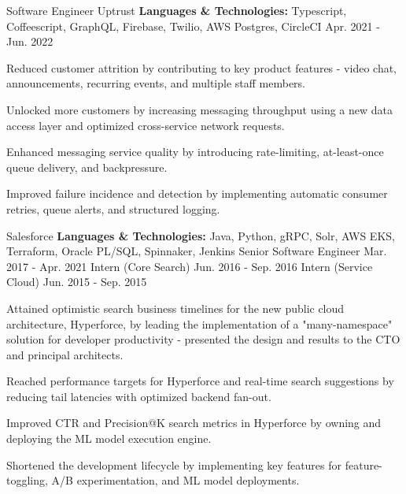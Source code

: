 
\begin{cventries}

  \cventry
    {Software Engineer}
    {Uptrust}
    {\textbf{Languages \& Technologies:} Typescript, Coffeescript, GraphQL, Firebase, Twilio, AWS Postgres, CircleCI}
    {Apr. 2021 - Jun. 2022}
    {
      \begin{cvitems}
        \item {Reduced customer attrition by contributing to key product features - video chat, announcements, recurring events, and multiple staff members.}
        \item {Unlocked more customers by increasing messaging throughput using a new data access layer and optimized cross-service network requests.}
        \item {Enhanced messaging service quality by introducing rate-limiting, at-least-once queue delivery, and backpressure.}
        \item {Improved failure incidence and detection by implementing automatic consumer retries, queue alerts, and structured logging.}
      \end{cvitems}
    }

  \cvthreeentry
    {Salesforce}
    {\textbf{Languages \& Technologies:} Java, Python, gRPC, Solr, AWS EKS, Terraform, Oracle PL/SQL, Spinnaker, Jenkins}
    {Senior Software Engineer}
    {Mar. 2017 - Apr. 2021}
    {Intern (Core Search)}
    {Jun. 2016 - Sep. 2016}
    {Intern (Service Cloud)}
    {Jun. 2015 - Sep. 2015}
    {
      \begin{cvitems}
        \item {Attained optimistic search business timelines for the new public cloud architecture, Hyperforce, by leading the implementation of a "many-namespace" solution for developer productivity - presented the design and results to the CTO and principal architects.}
        \item {Reached performance targets for Hyperforce and real-time search suggestions by reducing tail latencies with optimized backend fan-out.}
        \item {Improved CTR and Precision@K search metrics in Hyperforce by owning and deploying the ML model execution engine.}
        \item {Shortened the development lifecycle by implementing key features for feature-toggling, A/B experimentation, and ML model deployments.}
      \end{cvitems}
    }


\end{cventries}
